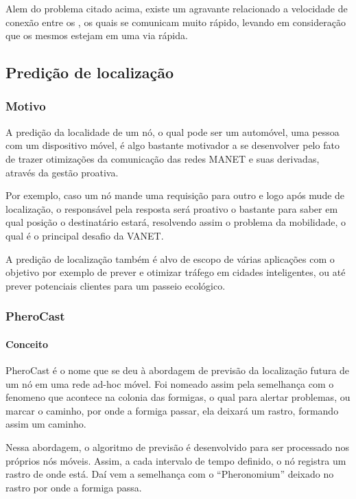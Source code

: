 \documentclass[12pt, %
openright, 
oneside,
a4paper,
brazil]{facom-ufu-abntex2}
\begin{document}
Alem do problema citado acima, existe um agravante relacionado a velocidade de conexão entre os , os quais se comunicam muito rápido, levando em consideração que os mesmos estejam em uma via rápida.

\subsection{Predição de localização}
\subsubsection{Motivo}
A predição da localidade de um nó, o qual pode ser um automóvel, uma pessoa com um dispositivo móvel, é algo bastante motivador a se desenvolver pelo fato de trazer otimizações da comunicação das redes MANET e suas derivadas, através da gestão proativa. \cite{6838650}

Por exemplo, caso um nó mande uma requisição para outro e logo após mude de localização, o responsável pela resposta será proativo o bastante para saber em qual posição o destinatário estará, resolvendo assim o problema da mobilidade, o qual é o principal desafio da VANET.

A predição de localização também é alvo de escopo de várias aplicações com o objetivo por exemplo de prever e otimizar tráfego em cidades inteligentes, ou até prever potenciais clientes para um passeio ecológico.

\subsubsection{PheroCast}
\paragraph{Conceito}
PheroCast é o nome que se deu à abordagem de previsão da localização futura de um nó em uma rede ad-hoc móvel. Foi nomeado assim pela semelhança com o fenomeno que acontece na colonia das formigas, o qual para alertar problemas, ou marcar o caminho, por onde a formiga passar, ela deixará um rastro, formando assim um caminho.

Nessa abordagem, o algoritmo de previsão é desenvolvido para ser processado nos próprios nós móveis. Assim, a cada intervalo de tempo definido, o nó registra um rastro de onde está. Daí vem a semelhança com o ``Pheronomium''  deixado no rastro por onde a formiga passa.
\end{document}
